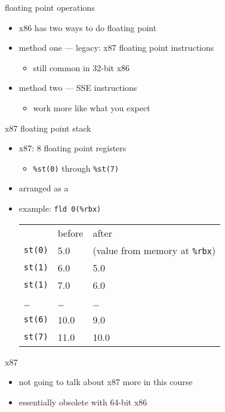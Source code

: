 \usetikzlibrary{calc}

\begin{frame}{floating point operations}
    \begin{itemize}
    \item x86 has two ways to do floating point
    \item method one --- legacy: x87 floating point instructions
        \begin{itemize}
        \item still common in 32-bit x86
        \end{itemize}
    \item method two --- SSE instructions
        \begin{itemize}
        \item work more like what you expect
        \end{itemize}
    \end{itemize}
\end{frame}

\begin{frame}[fragile,label=x87Stack]{x87 floating point stack}
    \begin{itemize}
    \item x87: 8 floating point registers
        \begin{itemize}
        \item {\tt \%st(0)} through {\tt \%st(7)}
        \end{itemize}
    \item arranged as a 
    \item example: \lstinline|fld 0(%rbx)| 
        \begin{tabular}{l@{: }ll}
        ~ & before & after \\
        {\tt st(0)} & 5.0 & (value from memory at {\tt \%rbx}) \\
        {\tt st(1)} & 6.0 & 5.0 \\
        {\tt st(1)} & 7.0 & 6.0 \\
        \ldots      & \ldots & \ldots \\
        {\tt st(6)} & 10.0 & 9.0 \\
        {\tt st(7)} & 11.0 & 10.0 \\
        \end{tabular}
    \end{itemize}
\end{frame}

\begin{frame}{x87}
    \begin{itemize}
    \item not going to talk about x87 more in this course
    \item essentially obsolete with 64-bit x86
    \end{itemize}
\end{frame}

